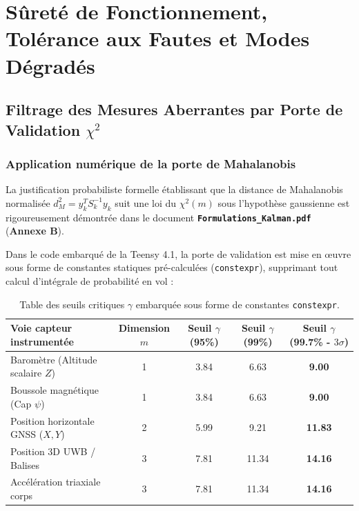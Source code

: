 \documentclass[../Implementation.tex]{subfiles}
\begin{document}
\section{Sûreté de Fonctionnement, Tolérance aux Fautes et Modes Dégradés}

\subsection{Filtrage des Mesures Aberrantes par Porte de Validation \texorpdfstring{$\chi^2$}{Chi-2}}

\subsubsection{Application numérique de la porte de Mahalanobis}
La justification probabiliste formelle établissant que la distance de Mahalanobis normalisée $d_M^2 = y_k^T S_k^{-1} y_k$ suit une loi du $\chi^2(m)$ sous l'hypothèse gaussienne est rigoureusement démontrée dans le document \textbf{\texttt{Formulations\_Kalman.pdf}} (\textbf{Annexe B}).

Dans le code embarqué de la Teensy 4.1, la porte de validation est mise en œuvre sous forme de constantes statiques pré-calculées (\lstinline|constexpr|), supprimant tout calcul d'intégrale de probabilité en vol :

\begin{table}[htbp]
\centering
\small
\begin{tabular}{lcccc}
\toprule
\textbf{Voie capteur instrumentée} & \textbf{Dimension $m$} & \textbf{Seuil $\gamma$ (95\%)} & \textbf{Seuil $\gamma$ (99\%)} & \textbf{Seuil $\gamma$ (99.7\% - $3\sigma$)} \\
\midrule
Baromètre (Altitude scalaire $Z$) & 1 & 3.84 & 6.63 & \textbf{9.00} \\
Boussole magnétique (Cap $\psi$) & 1 & 3.84 & 6.63 & \textbf{9.00} \\
Position horizontale GNSS ($X, Y$) & 2 & 5.99 & 9.21 & \textbf{11.83} \\
Position 3D UWB / Balises & 3 & 7.81 & 11.34 & \textbf{14.16} \\
Accélération triaxiale corps & 3 & 7.81 & 11.34 & \textbf{14.16} \\
\bottomrule
\end{tabular}
\caption{Table des seuils critiques $\gamma$ embarquée sous forme de constantes \lstinline|constexpr|.}
\label{tab:seuils_gating_cpp}
\end{table}
\end{document}
